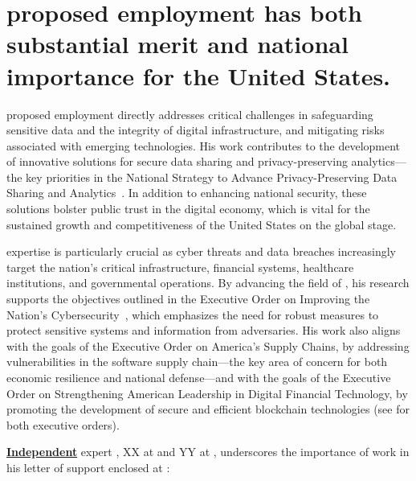 \section{\drs proposed employment has both substantial merit and 
national importance for the United States.}
\label{sec:benefit}

\drs proposed employment directly addresses critical challenges in safeguarding
sensitive data and the integrity of digital infrastructure, and mitigating
risks associated with emerging technologies.
His work contributes to the development of innovative solutions for secure data
sharing and privacy-preserving analytics---the key priorities in the National
Strategy to Advance Privacy-Preserving Data Sharing and Analytics~\cite{government}.
In addition to enhancing national security, these solutions bolster public trust
in the digital economy, which is vital for the sustained growth and
competitiveness of the United States on the global stage.

\drs expertise is particularly crucial as cyber threats and data
breaches increasingly target the nation's critical infrastructure, financial
systems, healthcare institutions, and governmental operations. 
By advancing the field of \dpcs, his research supports the objectives outlined
in the Executive Order on Improving the Nation's
Cybersecurity~\cite{government}, which emphasizes the need for robust measures
to protect sensitive systems and information from adversaries. 
His work also aligns with the goals of the Executive Order on America's Supply
Chains, by addressing vulnerabilities in the software supply chain---the key
area of concern for both economic resilience and national defense---and with the
goals of the Executive Order on Strengthening American Leadership in Digital
Financial Technology, by promoting the development of secure and efficient
blockchain technologies (see  for both executive orders).

\textbf{\uline{Independent}} expert \eee, XX at \purpleinc and YY at \cyanuni,
underscores the importance of \drs work in his letter of support enclosed at :

